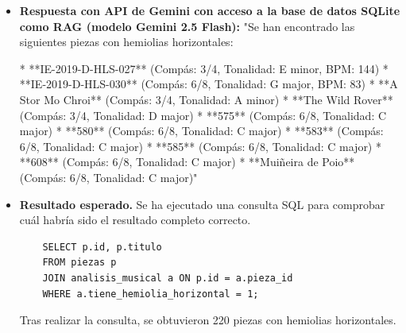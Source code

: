 \begin{itemize}
Para identificar piezas con hemiolías horizontales, buscaría:

1. **Cambios inusuales en la duración**: Hemolias horizontales suelen implicar cambios abruptos en la duración de las notas, como pasar de una sexta ala octava por compás.
2. **Incongruencias rítmicas**: La combinación de dos o más valores rítmicos diferentes (como 3/4 y 6/8) dentro del mismo compás puede indicar la presencia de una hemolia horizontal.
3. **Uso de símbolos especiales**: Los editores musicales pueden utilizar símbolos especiales, como el ""hemiónimo"" (en lugar de un hemiónimo), para indicar que se debe leer más allá de la línea del compás o en otro compás.
4. **Análisis del contexto musical**: Considerar el estilo y la estructura general de la pieza puede ayudar a identificar hemolías horizontales, especialmente si el compositor está experimentando con ritmos inusuales.

Si deseas obtener ayuda específica para encontrar hemiolías horizontales en una obra musical o necesitas más detalles sobre cómo reconocerlas, por favor proporciona más información o contexto sobre la pieza que estás buscando analizar."
    \item \textbf{Respuesta con API de Gemini con acceso a la base de datos SQLite como RAG (modelo Gemini 2.5 Flash):} "Se han encontrado las siguientes piezas con hemiolias horizontales:

*   **IE-2019-D-HLS-027** (Compás: 3/4, Tonalidad: E minor, BPM: 144)
*   **IE-2019-D-HLS-030** (Compás: 6/8, Tonalidad: G major, BPM: 83)
*   **A Stor Mo Chroi** (Compás: 3/4, Tonalidad: A minor)
*   **The Wild Rover** (Compás: 3/4, Tonalidad: D major)
*   **575** (Compás: 6/8, Tonalidad: C major)
*   **580** (Compás: 6/8, Tonalidad: C major)
*   **583** (Compás: 6/8, Tonalidad: C major)
*   **585** (Compás: 6/8, Tonalidad: C major)
*   **608** (Compás: 6/8, Tonalidad: C major)
*   **Muiñeira de Poio** (Compás: 6/8, Tonalidad: C major)"
    \item \textbf{Resultado esperado.} Se ha ejecutado una consulta SQL para comprobar cuál habría sido el resultado completo correcto.
    \begin{verbatim}
    SELECT p.id, p.titulo
    FROM piezas p
    JOIN analisis_musical a ON p.id = a.pieza_id
    WHERE a.tiene_hemiolia_horizontal = 1;
    \end{verbatim}    
    Tras realizar la consulta, se obtuvieron 220 piezas con hemiolias horizontales.
    

\end{itemize}
